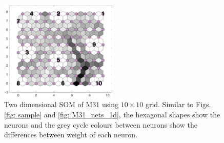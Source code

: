 \begin{figure}
        \centering
        \includegraphics[width=0.5\textwidth]{../../images0.01/M31/2D/diff_dimension/combine_2D_data_between_cols3and26.png}
    \caption{Two dimensional SOM of M31 using $10\times10$ grid. Similar to Figs.\ref{fig: sample} and \ref{fig: M31_nets_1d}, the hexagonal shapes show the neurons and the grey cycle colours between neurons show the differences between weight of each neuron.}
    \label{fig: all_derived_ones}
\end{figure}